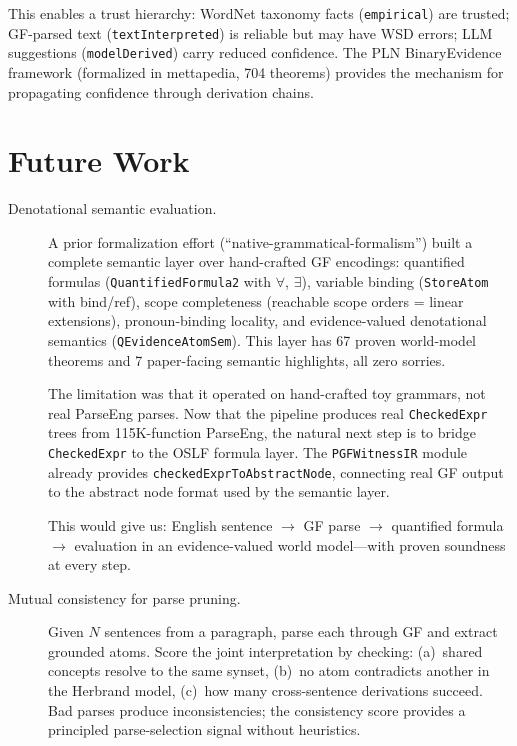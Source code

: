 \documentclass[]{article}
\newcommand{\code}[1]{\texttt{#1}}
\begin{document}
This enables a trust hierarchy: WordNet taxonomy facts
(\code{empirical}) are trusted; GF-parsed text
(\code{textInterpreted}) is reliable but may have WSD errors;
LLM suggestions (\code{modelDerived}) carry reduced confidence.
The PLN BinaryEvidence framework (formalized in mettapedia,
704 theorems) provides the mechanism for propagating confidence
through derivation chains.

\section{Future Work}
\label{sec:future}

\begin{description}
\item[Denotational semantic evaluation.]
  A prior formalization effort (``native-grammatical-formalism'')
  built a complete semantic layer over hand-crafted GF encodings:
  quantified formulas (\code{QuantifiedFormula2} with $\forall$,
  $\exists$), variable binding (\code{StoreAtom} with bind/ref),
  scope completeness (reachable scope orders = linear extensions),
  pronoun-binding locality, and evidence-valued denotational
  semantics (\code{QEvidenceAtomSem}).  This layer has 67 proven
  world-model theorems and 7 paper-facing semantic highlights,
  all zero sorries.

  The limitation was that it operated on hand-crafted toy grammars,
  not real ParseEng parses.  Now that the pipeline produces
  real \code{CheckedExpr} trees from 115K-function ParseEng, the
  natural next step is to bridge \code{CheckedExpr} to the OSLF
  formula layer.  The \code{PGFWitnessIR} module already provides
  \code{checkedExprToAbstractNode}, connecting real GF output to
  the abstract node format used by the semantic layer.

  This would give us: English sentence $\to$ GF parse $\to$
  quantified formula $\to$ evaluation in an evidence-valued
  world model---with proven soundness at every step.

\item[Mutual consistency for parse pruning.]
  Given $N$ sentences from a paragraph, parse each through GF and
  extract grounded atoms.  Score the joint interpretation by
  checking: (a)~shared concepts resolve to the same synset,
  (b)~no atom contradicts another in the Herbrand model,
  (c)~how many cross-sentence derivations succeed.
  Bad parses produce inconsistencies; the consistency score
  provides a principled parse-selection signal without heuristics.


\end{description}
\end{document}
